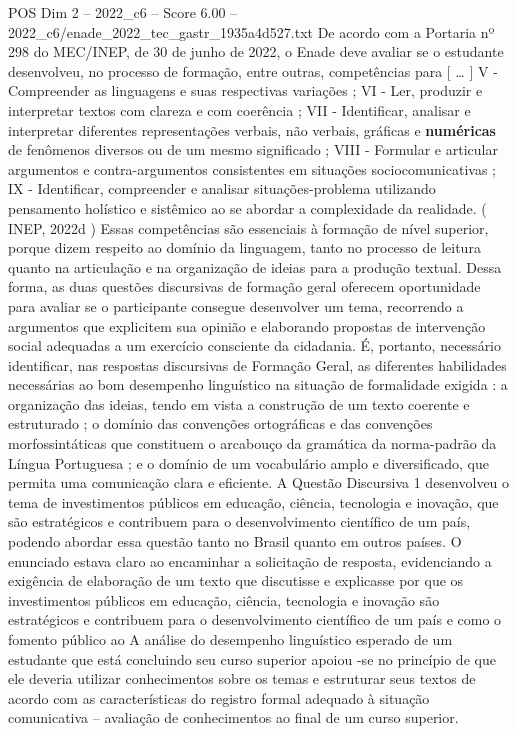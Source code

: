 \begin{textsample}{POS Dim 2 – 2022\_c6 – Score 6.00 – 2022\_c6/enade\_2022\_tec\_gastr\_1935a4d527.txt}
De acordo com a Portaria nº 298 do MEC/INEP, de 30 de junho de 2022, o Enade deve avaliar se o estudante desenvolveu, no processo de formação, entre outras, competências para [ … ] V - Compreender as linguagens e suas respectivas variações ; VI - Ler, produzir e interpretar textos com clareza e com coerência ; VII - Identificar, analisar e interpretar diferentes representações verbais, não verbais, gráficas e \textbf{numéricas} de fenômenos diversos ou de um mesmo significado ; VIII - Formular e articular argumentos e contra-argumentos consistentes em situações sociocomunicativas ; IX - Identificar, compreender e analisar situações-problema utilizando pensamento holístico e sistêmico ao se abordar a complexidade da realidade. ( INEP, 2022d ) Essas competências são essenciais à formação de nível superior, porque dizem respeito ao domínio da linguagem, tanto no processo de leitura quanto na articulação e na organização de ideias para a produção textual.
Dessa forma, as duas questões discursivas de formação geral oferecem oportunidade para avaliar se o participante consegue desenvolver um tema, recorrendo a argumentos que explicitem sua opinião e elaborando propostas de intervenção social adequadas a um exercício consciente da cidadania.
É, portanto, necessário identificar, nas respostas discursivas de Formação Geral, as diferentes habilidades necessárias ao bom desempenho linguístico na situação de formalidade exigida : a organização das ideias, tendo em vista a construção de um texto coerente e estruturado ; o domínio das convenções ortográficas e das convenções morfossintáticas que constituem o arcabouço da gramática da norma-padrão da Língua Portuguesa ; e o domínio de um vocabulário amplo e diversificado, que permita uma comunicação clara e eficiente.
A Questão Discursiva 1 desenvolveu o tema de investimentos públicos em educação, ciência, tecnologia e inovação, que são estratégicos e contribuem para o desenvolvimento científico de um país, podendo abordar essa questão tanto no Brasil quanto em outros países.
O enunciado estava claro ao encaminhar a solicitação de resposta, evidenciando a exigência de elaboração de um texto que discutisse e explicasse por que os investimentos públicos em educação, ciência, tecnologia e inovação são estratégicos e contribuem para o desenvolvimento científico de um país e como o fomento público ao A análise do desempenho linguístico esperado de um estudante que está concluindo seu curso superior apoiou -se no princípio de que ele deveria utilizar conhecimentos sobre os temas e estruturar seus textos de acordo com as características do registro formal adequado à situação comunicativa – avaliação de conhecimentos ao final de um curso superior.

\end{textsample}
